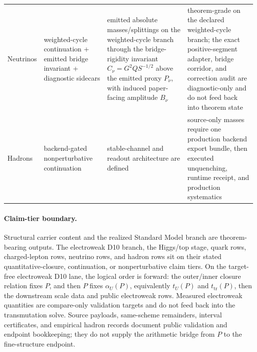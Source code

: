 \begin{longtable}{@{}>{\raggedright\arraybackslash}p{}>{\raggedright\arraybackslash}p{}>{\raggedright\arraybackslash}p{}>{\raggedright\arraybackslash}p{}@{}}
Neutrinos & weighted-cycle continuation + emitted bridge invariant + diagnostic sidecars & emitted absolute masses/splittings on the weighted-cycle branch through the bridge-rigidity invariant \(C_\nu=G^2Q S^{-1/2}\) above the emitted proxy \(P_\nu\), with induced paper-facing amplitude \(B_\nu\) & theorem-grade on the declared weighted-cycle branch; the exact positive-segment adapter, bridge corridor, and correction audit are diagnostic-only and do not feed back into theorem state \\
Hadrons & backend-gated nonperturbative continuation & stable-channel and readout architecture are defined & source-only masses require one production backend export bundle, then executed unquenching, runtime receipt, and production systematics \\
\end{longtable}
\normalsize

\paragraph{Claim-tier boundary.}
Structural carrier content and the realized Standard Model branch are theorem-bearing outputs.
The electroweak D10 branch, the Higgs/top stage, quark rows, charged-lepton rows, neutrino rows, and
hadron rows sit on their stated quantitative-closure, continuation, or nonperturbative claim tiers.
On the target-free electroweak D10 lane, the logical order is forward: the outer/inner closure relation fixes \(P\), and then \(P\) fixes \(\alpha_U(P)\),
equivalently \(t_U(P)\) and \(t_{\mathrm{tr}}(P)\), then the downstream scale data and public
electroweak rows. Measured electroweak quantities are compare-only validation targets and do
not feed back into the transmutation solve. Source payloads, same-scheme remainders, interval
certificates, and empirical hadron records document public validation and endpoint bookkeeping;
they do not supply the arithmetic bridge from \(P\) to the fine-structure endpoint.

